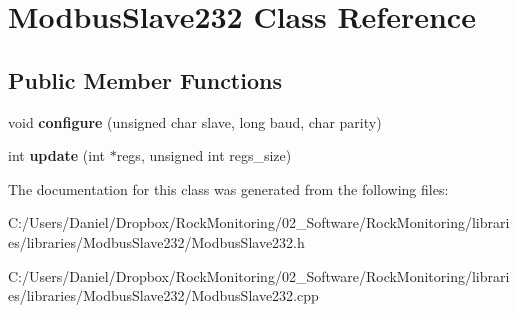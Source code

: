 \hypertarget{class_modbus_slave232}{}\section{Modbus\+Slave232 Class Reference}
\label{class_modbus_slave232}
\subsection*{Public Member Functions}
\begin{DoxyCompactItemize}
\item 
void {\bfseries configure} (unsigned char slave, long baud, char parity)\hypertarget{class_modbus_slave232_a52ca35009ebddb3c6aed9b1e8d970497}{}\label{class_modbus_slave232_a52ca35009ebddb3c6aed9b1e8d970497}

\item 
int {\bfseries update} (int $\ast$regs, unsigned int regs\+\_\+size)\hypertarget{class_modbus_slave232_aa92fffcd24b86dc10222055b8151de1b}{}\label{class_modbus_slave232_aa92fffcd24b86dc10222055b8151de1b}

\end{DoxyCompactItemize}


The documentation for this class was generated from the following files\+:\begin{DoxyCompactItemize}
\item 
C\+:/\+Users/\+Daniel/\+Dropbox/\+Rock\+Monitoring/02\+\_\+\+Software/\+Rock\+Monitoring/libraries/libraries/\+Modbus\+Slave232/Modbus\+Slave232.\+h\item 
C\+:/\+Users/\+Daniel/\+Dropbox/\+Rock\+Monitoring/02\+\_\+\+Software/\+Rock\+Monitoring/libraries/libraries/\+Modbus\+Slave232/Modbus\+Slave232.\+cpp\end{DoxyCompactItemize}
